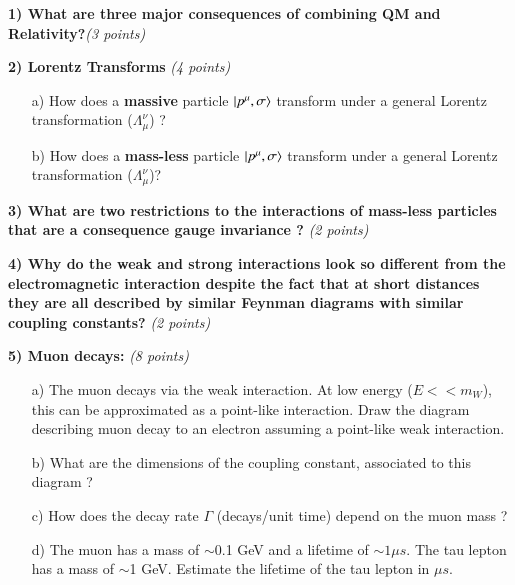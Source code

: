 {\large



\textbf{1) What are three major consequences of combining QM and Relativity?}\hfill \textit{(3 points)}\\

\vspace{0.5in}


\textbf{2) Lorentz Transforms } \hfill \textit{(4 points)}\\
\begin{itemize}
\item[a)] How does a \textbf{massive} particle $\ket{p^\mu,\sigma}$ transform under a general Lorentz transformation ($\Lambda_\mu^\nu$) ?
\vspace*{0.2in}
\item[b)] How does a \textbf{mass-less} particle $\ket{p^\mu,\sigma}$ transform under a general Lorentz transformation ($\Lambda_\mu^\nu$)?
\vspace*{0.2in}
\end{itemize}



\textbf{3) What are two restrictions to the interactions of mass-less particles that are a consequence gauge invariance ? }\hfill \textit{(2 points)}\\

\vspace{0.5in}


\textbf{4) Why do the weak and strong interactions look so different from the electromagnetic interaction despite the fact that at short distances they are all described by similar Feynman diagrams with similar coupling constants?} \hfill \textit{(2 points)}\\

\vspace{0.5in}

\clearpage

\textbf{5) Muon decays: } \hfill \textit{(8 points)}\\
\begin{itemize}
  \item[a)]{ The muon decays via the weak interaction.  At low energy ($E << m_W$), this can be approximated as a point-like interaction. 
  Draw the diagram describing muon decay to an electron assuming a point-like weak interaction. 
  \vspace*{0.5in}
}
  \item[b)]{What are the dimensions of the coupling constant, associated to this diagram  ?
\vspace*{0.5in}
  }
  \item[c)] How does the decay rate $\Gamma$ (decays/unit time)  depend on the muon mass ? 
\vspace*{0.5in}
  \item[d)]{ The muon has a mass of $\sim$0.1 GeV and a lifetime of $\sim 1 \mu s$. The tau lepton has a mass of {$\sim$1 GeV}. Estimate the lifetime of the tau lepton in $\mu s$.
\vspace*{0.5in}
}
\end{itemize}


}
